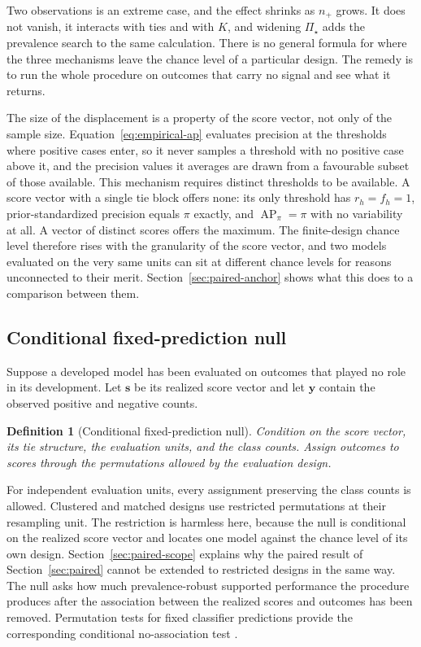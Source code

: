 \documentclass[11pt]{article}
\newcommand{\AP}{\operatorname{AP}}
\newcommand{\PSet}{\Pi_\star}
\newtheorem{definition}{Definition}
\theoremstyle{remark}
\begin{document}
Two observations is an extreme case, and the effect shrinks as $n_+$ grows. It does not vanish, it interacts with ties and with $K$, and widening $\PSet$ adds the prevalence search to the same calculation. There is no general formula for where the three mechanisms leave the chance level of a particular design. The remedy is to run the whole procedure on outcomes that carry no signal and see what it returns.

The size of the displacement is a property of the score vector, not only of the sample size. Equation~\eqref{eq:empirical-ap} evaluates precision at the thresholds where positive cases enter, so it never samples a threshold with no positive case above it, and the precision values it averages are drawn from a favourable subset of those available. This mechanism requires distinct thresholds to be available. A score vector with a single tie block offers none: its only threshold has $r_h=f_h=1$, prior-standardized precision equals $\pi$ exactly, and $\AP_\pi=\pi$ with no variability at all. A vector of distinct scores offers the maximum. The finite-design chance level therefore rises with the granularity of the score vector, and two models evaluated on the very same units can sit at different chance levels for reasons unconnected to their merit. Section~\ref{sec:paired-anchor} shows what this does to a comparison between them.

\subsection{Conditional fixed-prediction null}

Suppose a developed model has been evaluated on outcomes that played no role in its development. Let $\mathbf{s}$ be its realized score vector and let $\mathbf{y}$ contain the observed positive and negative counts.

\begin{definition}[Conditional fixed-prediction null]
Condition on the score vector, its tie structure, the evaluation units, and the class counts. Assign outcomes to scores through the permutations allowed by the evaluation design.
\end{definition}

For independent evaluation units, every assignment preserving the class counts is allowed. Clustered and matched designs use restricted permutations at their resampling unit. The restriction is harmless here, because the null is conditional on the realized score vector and locates one model against the chance level of its own design. Section~\ref{sec:paired-scope} explains why the paired result of Section~\ref{sec:paired} cannot be extended to restricted designs in the same way. The null asks how much prevalence-robust supported performance the procedure produces after the association between the realized scores and outcomes has been removed. Permutation tests for fixed classifier predictions provide the corresponding conditional no-association test \cite{ojala2010permutation}.
\end{document}
